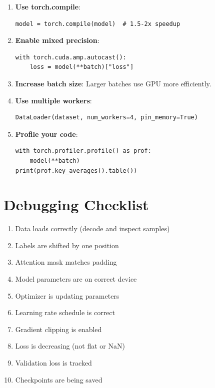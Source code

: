 \begin{enumerate}
    \item \textbf{Use torch.compile}:
    \begin{lstlisting}[style=python]
model = torch.compile(model)  # 1.5-2x speedup
    \end{lstlisting}

    \item \textbf{Enable mixed precision}:
    \begin{lstlisting}[style=python]
with torch.cuda.amp.autocast():
    loss = model(**batch)["loss"]
    \end{lstlisting}

    \item \textbf{Increase batch size}: Larger batches use GPU more efficiently.

    \item \textbf{Use multiple workers}:
    \begin{lstlisting}[style=python]
DataLoader(dataset, num_workers=4, pin_memory=True)
    \end{lstlisting}

    \item \textbf{Profile your code}:
    \begin{lstlisting}[style=python]
with torch.profiler.profile() as prof:
    model(**batch)
print(prof.key_averages().table())
    \end{lstlisting}
\end{enumerate}

\section{Debugging Checklist}

\begin{enumerate}
    \item[$\square$] Data loads correctly (decode and inspect samples)
    \item[$\square$] Labels are shifted by one position
    \item[$\square$] Attention mask matches padding
    \item[$\square$] Model parameters are on correct device
    \item[$\square$] Optimizer is updating parameters
    \item[$\square$] Learning rate schedule is correct
    \item[$\square$] Gradient clipping is enabled
    \item[$\square$] Loss is decreasing (not flat or NaN)
    \item[$\square$] Validation loss is tracked
    \item[$\square$] Checkpoints are being saved
\end{enumerate}

